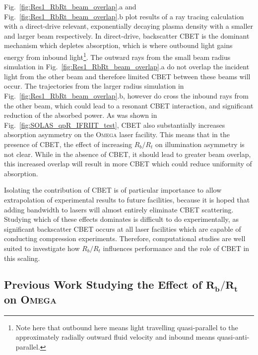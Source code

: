 Fig.~\ref{fig:Res1_RbRt_beam_overlap}.a and Fig.~\ref{fig:Res1_RbRt_beam_overlap}.b plot results of a ray tracing calculation with a direct-drive relevant, exponentially decaying plasma density with a smaller and larger beam respectively.
In direct-drive, backscatter \ac{CBET} is the dominant mechanism which depletes absorption, which is where outbound light gains energy from inbound light\footnote{Note here that outbound here means light travelling quasi-parallel to the approximately radially outward fluid velocity and inbound means quasi-anti-parallel.}.
The outward rays from the small beam radius simulation in Fig.~\ref{fig:Res1_RbRt_beam_overlap}.a do not overlap the incident light from the other beam and therefore limited \ac{CBET} between these beams will occur.
The trajectories from the larger radius simulation in Fig.~\ref{fig:Res1_RbRt_beam_overlap}.b, however do cross the inbound rays from the other beam, which could lead to a resonant \ac{CBET} interaction, and significant reduction of the absorbed power.
As was shown in Fig.~\ref{fig:SOLAS_qpR_IFRIIT_test}, \ac{CBET} also substantially increases absorption asymmetry on the \textsc{Omega} laser facility.
This means that in the presence of \ac{CBET}, the effect of increasing $R_b/R_t$ on illumination asymmetry is not clear.
While in the absence of \ac{CBET}, it should lead to greater beam overlap, this increased overlap will result in more \ac{CBET} which could reduce uniformity of absorption.

Isolating the contribution of \ac{CBET} is of particular importance to allow extrapolation of experimental results to future facilities, because it is hoped that adding bandwidth to lasers will almost entirely eliminate \ac{CBET} scattering.
Studying which of these effects dominates is difficult to do experimentally, as significant backscatter \ac{CBET} occurs at all laser facilities which are capable of conducting compression experiments.
Therefore, computational studies are well suited to investigate how $R_b/R_t$ influences performance and the role of \ac{CBET} in this scaling.


\subsection{Previous Work Studying the Effect of $\mathbf{R_b/R_t}$ on \textsc{Omega}}%
\label{sec:Res1_OMEGA_stat_modelling_RbRt}

